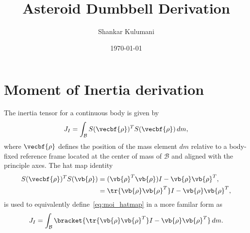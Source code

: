 \documentclass[11pt, reqno]{article}    %
\title{Asteroid Dumbbell Derivation}
\author{Shankar Kulumani}
\date{\today}                         %
\begin{document}
\maketitle

\section[Moment of Inertia]{Moment of Inertia derivation}\label{sec:moi_derivation}
The inertia tensor for a continuous body is given by
\begin{align}\label{eq:moi_hatmap}
    J_I = \int_\mathcal{B} S(\vecbf{\rho})^T S(\vecbf{\rho}) \, dm ,
\end{align}
where \( \vecbf{\rho}\) defines the position of the mass element \( dm \) relative to a body-fixed reference frame located at the center of mass of \( \mathcal{B} \) and aligned with the principle axes.
The hat map identity
\begin{align*}
    S(\vecbf{\rho})^T S(\vb{\rho}) &= (\vb{\rho}^T\vb{\rho}) I - \vb{\rho}\vb{\rho}^T , \\
    &= \tr{\vb{\rho}\vb{\rho}^T} I - \vb{\rho}\vb{\rho}^T ,
\end{align*}
is used to equivalently define~\cref{eq:moi_hatmap} in a more familar form as
\begin{align}\label{eq:moi}
    J_I = \int_{\mathcal{B}} \bracket{\tr{\vb{\rho}\vb{\rho}^T} I - \vb{\rho}\vb{\rho}^T} \, dm .
\end{align}
\end{document}
